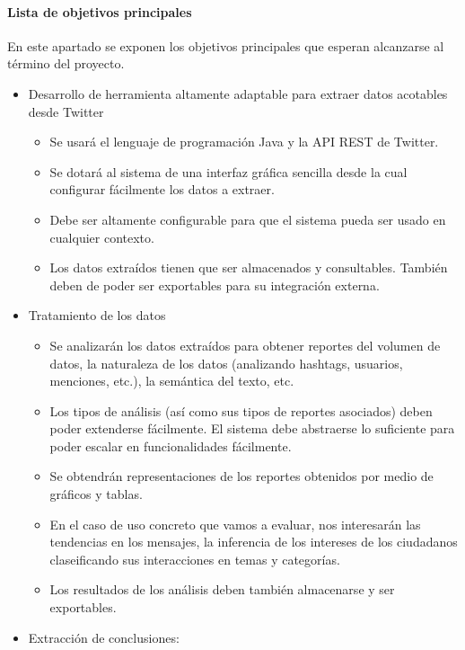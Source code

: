 \paragraph{Lista de objetivos principales}
En este apartado se exponen los objetivos principales que esperan alcanzarse al término del proyecto. 
\begin{itemize}
        \item Desarrollo de herramienta altamente adaptable para extraer datos acotables desde Twitter
        \begin{itemize}
                \item Se usará el lenguaje de programación Java y la API REST de Twitter.
                \item Se dotará al sistema de una interfaz gráfica sencilla desde la cual configurar fácilmente los datos a extraer. 
                \item Debe ser altamente configurable para que el sistema pueda ser usado en cualquier contexto.
                \item Los datos extraídos tienen que ser almacenados y consultables. También deben de poder ser exportables para su integración externa.
        \end{itemize}
       	\item Tratamiento de los datos
       	\begin{itemize}
       		\item Se analizarán los datos extraídos para obtener reportes del volumen de datos, la naturaleza de los datos (analizando hashtags, usuarios, menciones, etc.), la semántica del texto, etc.
       		\item Los tipos de análisis (así como sus tipos de reportes asociados) deben poder extenderse fácilmente. El sistema debe abstraerse lo suficiente para poder escalar en funcionalidades fácilmente.
       		\item Se obtendrán representaciones de los reportes obtenidos por medio de gráficos y tablas. 
       		\item En el caso de uso concreto que vamos a evaluar, nos interesarán las tendencias en los mensajes, la inferencia de los intereses de los ciudadanos claseificando sus interacciones en temas y categorías.
       		\item Los resultados de los análisis deben también almacenarse y ser exportables.
       	\end{itemize}
       \newpage
       \item Extracción de conclusiones:
       \begin{itemize}

\end{itemize}
\end{itemize}
